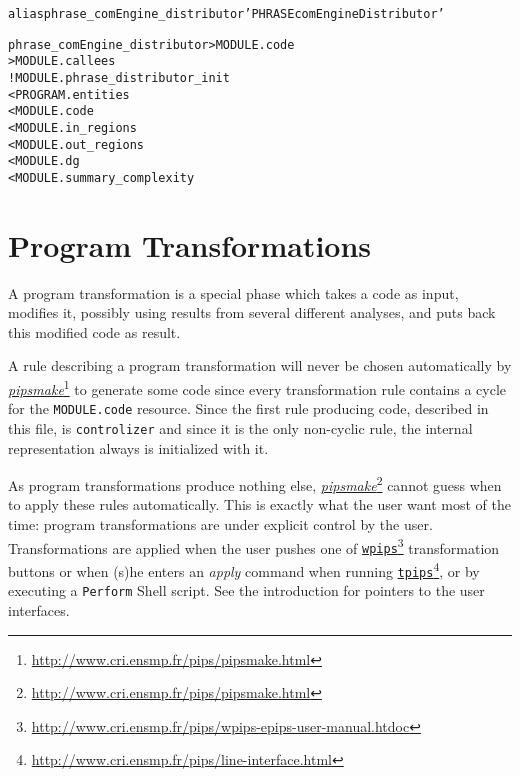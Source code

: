 \documentclass[a4paper]{report}
\newenvironment{PipsMake}{\begin{alltt}}{\end{alltt}}
\newcommand{\LINK}[2]{\href{#2}{#1}\footnote{\url{#2}}\xspace}
\newcommand{\PIPSMAKE}{\LINK{\emph{pipsmake}}{http://www.cri.ensmp.fr/pips/pipsmake.html}\xspace}
\newcommand{\TPIPS}{\LINK{\texttt{tpips}}{http://www.cri.ensmp.fr/pips/line-interface.html}}
\newcommand{\WPIPS}{\LINK{\texttt{wpips}}{http://www.cri.ensmp.fr/pips/wpips-epips-user-manual.htdoc}}
\begin{document}
\begin{PipsMake}
alias phrase_comEngine_distributor 'PHRASE comEngine Distributor'

phrase_comEngine_distributor                       > MODULE.code
                                                   > MODULE.callees
        ! MODULE.phrase_distributor_init
        < PROGRAM.entities
        < MODULE.code
        < MODULE.in_regions
        < MODULE.out_regions
        < MODULE.dg
        < MODULE.summary_complexity
\end{PipsMake}


\chapter{Program Transformations}
\label{section-program-transformations}

A program transformation is a special phase which takes a code as
input, modifies it, possibly using results from several different
analyses, and puts back this modified code as result.

A rule describing a program transformation will never be chosen
automatically by \PIPSMAKE{} to generate some code since every
transformation rule contains a cycle for the \verb+MODULE.code+
resource. Since the first rule producing code, described in this file,
is \verb+controlizer+ and since it is the only non-cyclic rule, the
internal representation always is initialized with it.

As program transformations produce nothing else, \PIPSMAKE{} cannot guess
when to apply these rules automatically. This is exactly what the user
want most of the time: program transformations are under explicit
control by the user. Transformations are applied when the user pushes
one of \WPIPS{} transformation buttons or when (s)he enters an {\em
apply} command when running \TPIPS{}, or by executing a
\verb+Perform+ Shell script. See the introduction for pointers to the
user interfaces.
\end{document}
